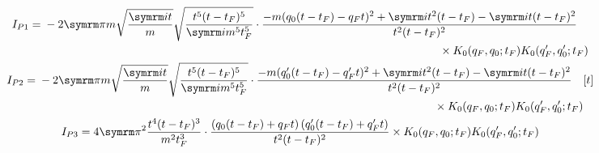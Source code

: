 \begin{gather}
    I_{P1} = \begin{multlined}[t]
        -2\cpi m \sqrt{\frac{\im t}{m}}\sqrt{\frac{t^5(t - t_F)^5}{\im m^5 t_F^5}}\cdot\frac{-m(q_0(t - t_F) - q_Ft)^2 + \im t^2(t - t_F) - \im t(t - t_F)^2}{t^2(t - t_F)^2} \\ \times K_0(q_F, q_0; t_F)K_0(q_F', q_0'; t_F)
    \end{multlined} \\
    I_{P2} = \begin{multlined}[t]
        -2\cpi m \sqrt{\frac{\im t}{m}}\sqrt{\frac{t^5(t - t_F)^5}{\im m^5 t_F^5}}\cdot\frac{-m(q_0'(t - t_F) - q_F't)^2 + \im t^2(t - t_F) - \im t(t - t_F)^2}{t^2(t - t_F)^2} \\ \times K_0(q_F, q_0; t_F)K_0(q_F', q_0'; t_F)
    \end{multlined}[t] \\
    I_{P3} = \begin{multlined}[t]
        4\cpi^2\frac{t^4 (t - t_F)^3}{m^2t_F^3}\cdot\frac{\left(q_0(t - t_F) + q_Ft\right)\left(q_0'(t - t_F) + q_F't\right)}{t^2(t - t_F)^2} \times K_0(q_F, q_0; t_F)K_0(q_F', q_0'; t_F)
    \end{multlined}
\end{gather}

